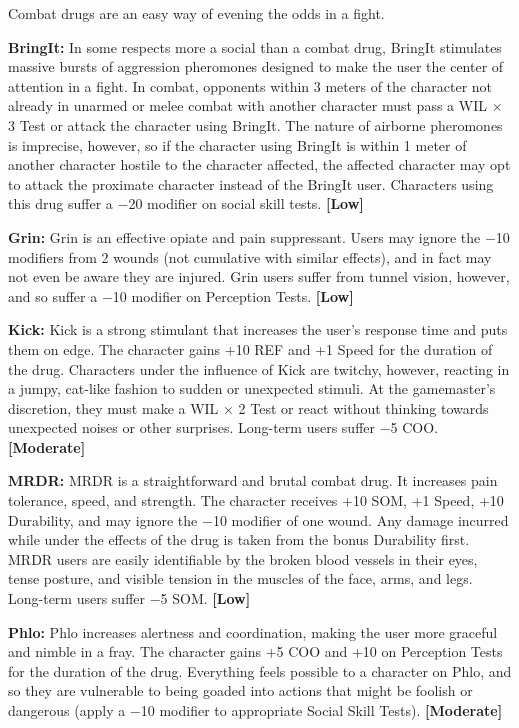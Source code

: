Combat drugs are an easy way of evening the odds in a fight. 

\textbf{BringIt:} In some respects more a social than a combat drug, BringIt stimulates massive bursts of aggression pheromones designed to make the user the center of attention in a fight. In combat, opponents within 3 meters of the character not already in unarmed or melee combat with another character must pass a WIL $\times$ 3 Test or attack the character using BringIt. The nature of airborne pheromones is imprecise, however, so if the character using BringIt is within 1 meter of another character hostile to the character affected, the affected character may opt to attack the proximate character instead of the BringIt user. Characters using this drug suffer a $-$20 modifier on social skill tests. \textbf{[Low]} 

\textbf{Grin:} Grin is an effective opiate and pain suppressant. Users may ignore the $-$10 modifiers from 2 wounds (not cumulative with similar effects), and in fact may not even be aware they are injured. Grin users suffer from tunnel vision, however, and so suffer a $-$10 modifier on Perception Tests. \textbf{[Low]} 

\textbf{Kick:} Kick is a strong stimulant that increases the user’s response time and puts them on edge. The character gains +10 REF and +1 Speed for the duration of the drug. Characters under the influence of Kick are twitchy, however, reacting in a jumpy, cat-like fashion to sudden or unexpected stimuli. At the gamemaster’s discretion, they must make a WIL $\times$ 2 Test or react without thinking towards unexpected noises or other surprises. Long-term users suffer $-$5 COO. \textbf{[Moderate]} 

\textbf{MRDR:} MRDR is a straightforward and brutal combat drug. It increases pain tolerance, speed, and strength. The character receives +10 SOM, +1 Speed, +10 Durability, and may ignore the $-$10 modifier of one wound. Any damage incurred while under the effects of the drug is taken from the bonus Durability first. MRDR users are easily identifiable by the broken blood vessels in their eyes, tense posture, and visible tension in the muscles of the face, arms, and legs. Long-term users suffer $-$5 SOM. \textbf{[Low]} 

\textbf{Phlo:} Phlo increases alertness and coordination, making the user more graceful and nimble in a fray. The character gains +5 COO and +10 on Perception Tests for the duration of the drug. Everything feels possible to a character on Phlo, and so they are vulnerable to being goaded into actions that might be foolish or dangerous (apply a $-$10 modifier to appropriate Social Skill Tests). \textbf{[Moderate]} 

